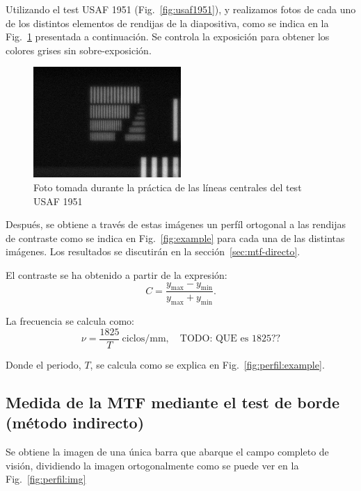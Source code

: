 \documentclass{./packages/optica-article}
\begin{document}
Utilizando el test USAF 1951 (Fig.~\ref{fig:usaf1951}), y realizamos fotos de cada uno de los distintos elementos de rendijas de la diapositiva, como se indica en la Fig.~\ref{fig:usafpic} presentada a continuación. Se controla la exposición para obtener los colores grises sin sobre-exposición.

\begin{figure}[!h]
	\centering
	\includegraphics[width=0.5\textwidth]{smallest_lines}
	\caption{Foto tomada durante la práctica de las líneas centrales del test USAF 1951}\label{fig:usafpic}
\end{figure}

Después, se obtiene a través de estas imágenes un perfíl ortogonal a las rendijas de contraste como se indica en Fig.~\ref{fig:example} para cada una de las distintas imágenes. Los resultados se discutirán en la sección~\ref{sec:mtf-directo}.



El contraste se ha obtenido a partir de la expresión:
\nopagebreak
\begin{equation}
	C = \frac{y_{\max} - y_{\min}}{y_{\max} + y_{\min}}.
	\label{eq:contraste}
\end{equation}

La frecuencia se calcula como:
\nopagebreak
\begin{equation}
	\nu = \frac{1825}{T}\ \textrm{ciclos/mm},\quad\textrm{TODO: QUE es 1825??}\label{eq:frecuencia}
\end{equation}

Donde el periodo, $T$, se calcula como se explica en Fig.~\ref{fig:perfil:example}.

\subsection{Medida de la MTF mediante el test de borde (método indirecto)}\label{sec:description:indirecto}

Se obtiene la imagen de una única barra que abarque el campo completo de visión, dividiendo la imagen ortogonalmente como se puede ver en la Fig.~\ref{fig:perfil:img}
\end{document}
